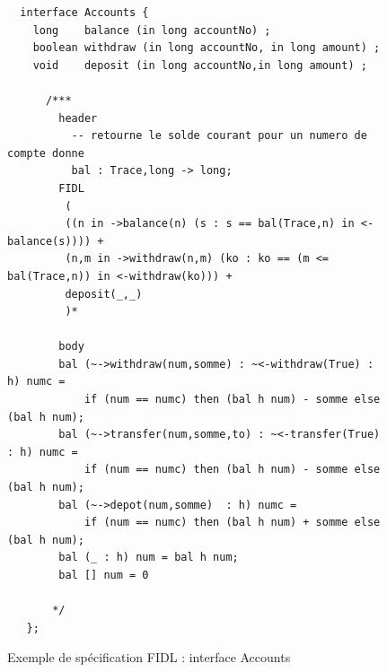 \begin{figure}[htbp]
    \centering
\begin{lstlisting}
  interface Accounts {
    long    balance (in long accountNo) ;
    boolean withdraw (in long accountNo, in long amount) ;
    void    deposit (in long accountNo,in long amount) ;
    
      /*** 
        header
          -- retourne le solde courant pour un numero de compte donne
          bal : Trace,long -> long;
        FIDL
         (
         ((n in ->balance(n) (s : s == bal(Trace,n) in <-balance(s)))) +
         (n,m in ->withdraw(n,m) (ko : ko == (m <= bal(Trace,n)) in <-withdraw(ko))) +
         deposit(_,_) 
         )*

        body
        bal (~->withdraw(num,somme) : ~<-withdraw(True) : h) numc = 
            if (num == numc) then (bal h num) - somme else (bal h num); 
        bal (~->transfer(num,somme,to) : ~<-transfer(True) : h) numc = 
            if (num == numc) then (bal h num) - somme else (bal h num); 
        bal (~->depot(num,somme)  : h) numc = 
            if (num == numc) then (bal h num) + somme else (bal h num);
        bal (_ : h) num = bal h num;
        bal [] num = 0
                
       */
   };   
\end{lstlisting}
        \caption{Exemple de sp\'ecification \textsf{FIDL} : interface Accounts}
    \label{fig-exifaceaccount}
\end{figure}

